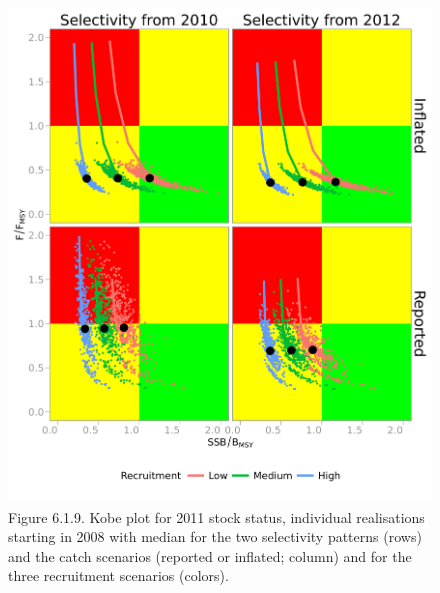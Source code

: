 \documentclass[a4paper, 10pt]{article}
\begin{document}
\begin{figure}[!ht]\begin{center}\includegraphics[width=6in]{6_1_9.png}\end{center}
\caption{Figure 6.1.9. Kobe plot for 2011 stock status, individual realisations starting in 
2008 with median for the two selectivity patterns (rows) and the catch scenarios 
(reported or inflated; column) and for the three recruitment scenarios (colors).}
\label{fig:2}\end{figure}
\end{document}

